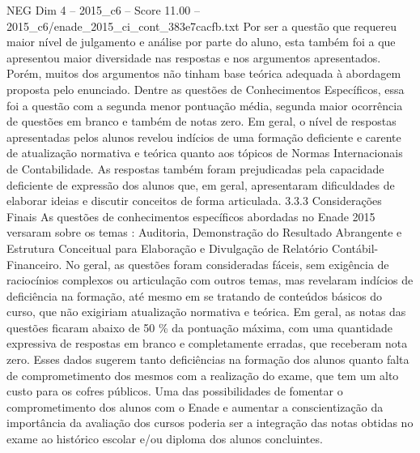 \begin{textsample}{NEG Dim 4 – 2015\_c6 – Score 11.00 – 2015\_c6/enade\_2015\_ci\_cont\_383e7cacfb.txt}
Por ser a questão que requereu maior nível de julgamento e análise por parte do aluno, esta também foi a que apresentou maior diversidade nas respostas e nos argumentos apresentados.
Porém, muitos dos argumentos não tinham base teórica adequada à abordagem proposta pelo enunciado.
Dentre as questões de Conhecimentos Específicos, essa foi a questão com a segunda menor pontuação média, segunda maior ocorrência de questões em branco e também de notas zero.
Em geral, o nível de respostas apresentadas pelos alunos revelou indícios de uma formação deficiente e carente de atualização normativa e teórica quanto aos tópicos de Normas Internacionais de Contabilidade.
As respostas também foram prejudicadas pela capacidade deficiente de expressão dos alunos que, em geral, apresentaram dificuldades de elaborar ideias e discutir conceitos de forma articulada. 3.3.3 Considerações Finais As questões de conhecimentos específicos abordadas no Enade 2015 versaram sobre os temas : Auditoria, Demonstração do Resultado Abrangente e Estrutura Conceitual para Elaboração e Divulgação de Relatório Contábil-Financeiro.
No geral, as questões foram consideradas fáceis, sem exigência de raciocínios complexos ou articulação com outros temas, mas revelaram indícios de deficiência na formação, até mesmo em se tratando de conteúdos básicos do curso, que não exigiriam atualização normativa e teórica.
Em geral, as notas das questões ficaram abaixo de 50 \% da pontuação máxima, com uma quantidade expressiva de respostas em branco e completamente erradas, que receberam nota zero.
Esses dados sugerem tanto deficiências na formação dos alunos quanto falta de comprometimento dos mesmos com a realização do exame, que tem um alto custo para os cofres públicos.
Uma das possibilidades de fomentar o comprometimento dos alunos com o Enade e aumentar a conscientização da importância da avaliação dos cursos poderia ser a integração das notas obtidas no exame ao histórico escolar e/ou diploma dos alunos concluintes.

\end{textsample}
